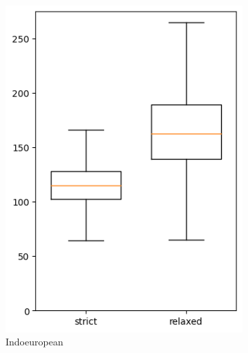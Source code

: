 \documentclass[]{rsos}%
\begin{document}
\begin{figure}
\begin{subfigure}{0.4\textwidth}
    \includegraphics[width=\textwidth]{supplement/analysis/indoeuropean_years_per_split.png}
    \caption{Indoeuropean}
  \end{subfigure}
  \begin{subfigure}{0.4\textwidth}

\end{subfigure}
\end{figure}
\end{document}

